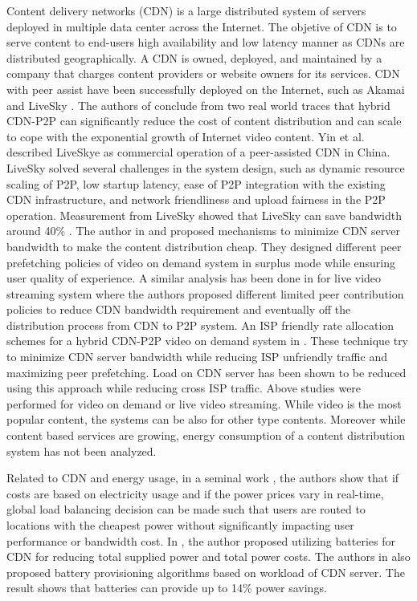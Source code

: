 Content delivery networks (CDN) is a large distributed system of servers deployed in multiple data center across the Internet. 
The objetive of CDN is to serve content to end-users high availability and low latency manner as CDNs are distributed geographically. 
A CDN is owned, deployed, and maintained by a company that charges content providers or website owners for its services.
CDN with peer assist have been successfully deployed on the Internet, such as Akamai \cite{Huang:2008:UHC:1496046.1496064} and LiveSky \cite{Yin:2010:LEC:1823746.1823750}.  
The authors of \cite{Huang:2008:UHC:1496046.1496064} conclude from two real world traces that hybrid CDN-P2P can significantly reduce the cost of content distribution and can scale to cope with the exponential growth of Internet video content.  
Yin et al. \cite{Yin:2010:LEC:1823746.1823750} described LiveSkye as commercial operation of a peer-assisted CDN in China.  
LiveSky solved several challenges in the system design, such as dynamic resource scaling of P2P, low startup latency, ease of P2P integration with the existing CDN infrastructure, and network friendliness and upload fairness in the P2P operation.  
Measurement from LiveSky showed that LiveSky can save bandwidth around 40\% \cite{Yin:2010:LEC:1823746.1823750}.
The author in \cite{Huang:2007:IVP:1282427.1282396} and \cite{huang2007peer} proposed mechanisms to minimize CDN server bandwidth to make the content distribution cheap.
They designed different peer prefetching policies of video on demand system in surplus mode while ensuring user quality of experience.
A similar analysis has been done in \cite{xu2006analysis} for live video streaming system where the authors proposed different limited peer contribution policies to reduce CDN bandwidth requirement and eventually off the distribution process from CDN to P2P system. 
An ISP friendly rate allocation schemes for a hybrid CDN-P2P video on demand system in \cite{Wang:2008:IRA:1459359.1459397}. 
These technique try to minimize CDN server bandwidth while reducing ISP unfriendly traffic and maximizing peer prefetching.
Load on CDN server has been shown to be reduced using this approach while reducing cross ISP traffic.
Above studies were performed for video on demand or live video streaming.
While video is the most popular content, the systems can be also for other type contents.
Moreover while content based services are growing, energy consumption of a content distribution system has not been analyzed.

Related to CDN and energy usage, in a seminal work \cite{qureshi2009cutting}, the authors show that if costs are based on electricity usage and if the power prices vary in real-time, global load balancing decision can be made such that users are routed to locations with the cheapest power without significantly impacting user performance or bandwidth cost.  
In \cite{Palasamudram:2012:UBR:2391229.2391240}, the author proposed utilizing batteries for CDN for reducing total supplied power and total power costs.
The authors in \cite{Palasamudram:2012:UBR:2391229.2391240} also proposed battery provisioning algorithms based on workload of CDN server. 
The result shows that batteries can provide up to 14\% power savings.

